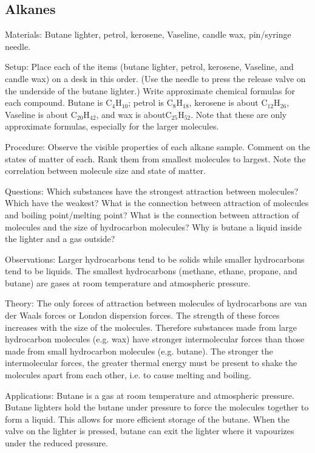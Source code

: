 \begin{multicols}{2}
\subsection{Alkanes}


\begin{description*}
\item[Materials:]{Butane lighter, petrol, kerosene, Vaseline, candle wax, pin/syringe needle.}
\item[Setup:]{Place each of the items (butane lighter, petrol, kerosene, Vaseline, and candle wax) on a desk in this order. (Use the needle to press the release valve on the underside of the butane lighter.) Write approximate chemical formulas for each compound. Butane is \ce C$_4$H$_{10}$; petrol is \ce C$_8$H$_{18}$, kerosene is about \ce C$_{12}$H$_{26}$, Vaseline is about \ce C$_{20}$H$_{42}$, and wax is about\ce C$_{25}$H$_{52}$. Note that these are only approximate formulas, especially for the larger molecules.}
\item[Procedure:]{Observe the visible properties of each alkane sample. Comment on the states of matter of each. Rank them from smallest molecules to largest. Note the correlation between molecule size and state of matter.}
\item[Questions:]{Which substances have the strongest attraction between molecules? Which have the weakest? What is the connection between attraction of molecules and boiling point/melting point? What is the connection between attraction of molecules and the size of hydrocarbon molecules? Why is butane a liquid inside the lighter and a gas outside?}
\item[Observations:]{Larger hydrocarbons tend to be solids while smaller hydrocarbons tend to be liquids. The smallest hydrocarbons (methane, ethane, propane, and butane) are gases at room temperature and atmospheric pressure.}
\item[Theory:]{The only forces of attraction between molecules of hydrocarbons are van der Waals forces or London dispersion forces. The strength of these forces increases with the size of the molecules. Therefore substances made from large hydrocarbon molecules (e.g. wax) have stronger intermolecular forces than those made from small hydrocarbon molecules (e.g. butane). The stronger the intermolecular forces, the greater thermal energy must be present to shake the molecules apart from each other, i.e. to cause melting and boiling.}
\item[Applications:]{Butane is a gas at room temperature and atmospheric pressure. Butane lighters hold the butane under pressure to force the molecules together to form a liquid. This allows for more efficient storage of the butane. When the valve on the lighter is pressed, butane can exit the lighter where it vapourizes under the reduced pressure.}
\end{description*}


\end{multicols}
